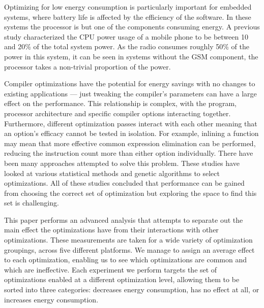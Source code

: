 \documentclass[twocolumn]{article}
\newcommand{\todo}[1]{\textbf{\textcolor{red}{#1}}}
\begin{document}
Optimizing for low energy consumption is particularly important for embedded systems, where battery life is affected by the efficiency of the software. In these systems the processor is but one of the components consuming energy. A previous study characterized the CPU power usage of a mobile phone to be between 10 and 20\% of the total system power\cite{SmartPhonePower}. As the radio consumes roughly 50\% of the power in this system, it can be seen in systems without the GSM component, the processor takes a non-trivial proportion of the power.


Compiler optimizations have the potential for energy savings with no changes to existing applications --- just tweaking the compiler's parameters can have a large effect on the performance. This relationship is complex, with the program, processor architecture and specific compiler options interacting together. Furthermore, different optimization passes interact with each other meaning that an option's efficacy cannot be tested in isolation. For example, inlining a function may mean that more effective common expression elimination can be performed, reducing the instruction count more than either option individually. There have been many approaches attempted to solve this problem\cite{Haneda2005, Lin2008, Triantafyllis}. These studies have looked at various statistical methods and genetic algorithms to select optimizations. All of these studies concluded that performance can be gained from choosing the correct set of optimization but exploring the space to find this set is challenging.

This paper performs an advanced analysis that attempts to separate out the main effect the optimizations have from their interactions with other optimizations. These measurements are taken for a wide variety of optimization groupings, across five different platforms. We manage to assign an average effect to each optimization, enabling us to see which optimizations are common and which are ineffective. Each experiment we perform targets the set of optimizations enabled at a different optimization level, allowing them to be sorted into three categories: decreases energy consumption, has no effect at all, or increases energy consumption.
\end{document}
